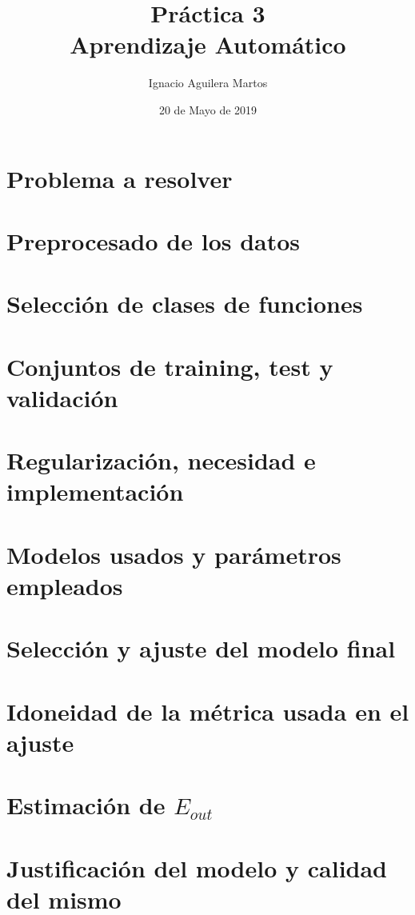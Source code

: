 \documentclass[12pt,a4paper]{article}
\author{Ignacio Aguilera Martos}
\title{Práctica 3 \\ Aprendizaje Automático}
\date{20 de Mayo de 2019}
\begin{document}
	\maketitle

	\tableofcontents

	\newpage

\section{Problema a resolver}

\section{Preprocesado de los datos}

\section{Selección de clases de funciones}

\section{Conjuntos de training, test y validación}

\section{Regularización, necesidad e implementación}

\section{Modelos usados y parámetros empleados}

\section{Selección y ajuste del modelo final}

\section{Idoneidad de la métrica usada en el ajuste}

\section{Estimación de $E_{out}$}

\section{Justificación del modelo y calidad del mismo}
\end{document}

